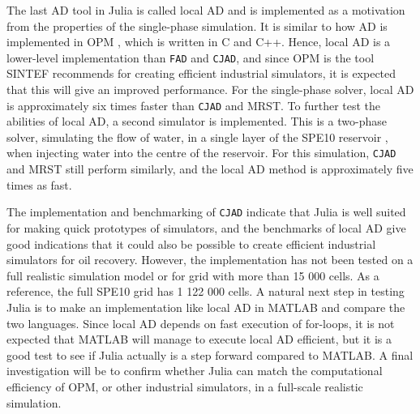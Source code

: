 The last AD tool in Julia is called local AD and is implemented as a motivation from the properties of the single-phase simulation. It is similar to how AD is implemented in OPM \emph{\citep{opm}}, which is written in C and C++. Hence, local AD is a lower-level implementation than \texttt{FAD} and \texttt{CJAD}, and since OPM is the tool SINTEF recommends for creating efficient industrial simulators, it is expected that this will give an improved performance. For the single-phase solver, local AD is approximately six times faster than \texttt{CJAD} and MRST. To further test the abilities of local AD, a second simulator is implemented. This is a two-phase solver, simulating the flow of water, in a single layer of the SPE10 reservoir \emph{\citep{SPE10}}, when injecting water into the centre of the reservoir. For this simulation, \texttt{CJAD} and MRST still perform similarly, and the local AD method is approximately five times as fast.

The implementation and benchmarking of \texttt{CJAD} indicate that Julia is well suited for making quick prototypes of simulators, and the benchmarks of local AD give good indications that it could also be possible to create efficient industrial simulators for oil recovery. However, the implementation has not been tested on a full realistic simulation model or for grid with more than 15 000 cells. As a reference, the full SPE10 grid has 1 122 000 cells. A natural next step in testing Julia is to make an implementation like local AD in MATLAB and compare the two languages. Since local AD depends on fast execution of for-loops, it is not expected that MATLAB will manage to execute local AD efficient, but it is a good test to see if Julia actually is a step forward compared to MATLAB. A final investigation will be to confirm whether Julia can match the computational efficiency of OPM, or other industrial simulators, in a full-scale realistic simulation. 

